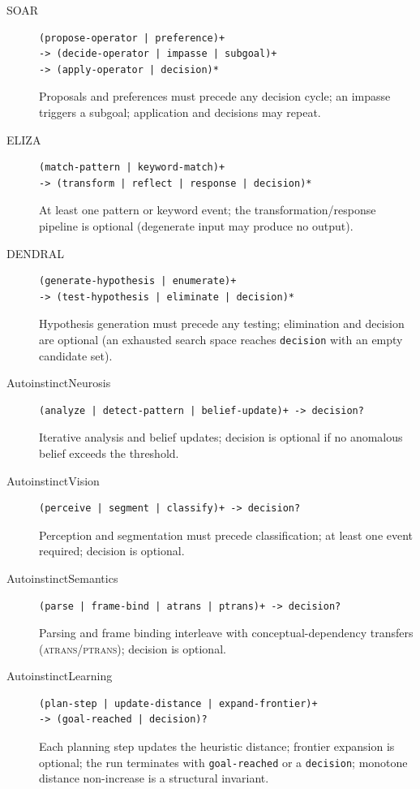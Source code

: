 \begin{description}
\item[SOAR]
\begin{verbatim}
(propose-operator | preference)+
-> (decide-operator | impasse | subgoal)+
-> (apply-operator | decision)*
\end{verbatim}
Proposals and preferences must precede any decision cycle; an impasse
triggers a subgoal; application and decisions may repeat.

\item[ELIZA]
\begin{verbatim}
(match-pattern | keyword-match)+
-> (transform | reflect | response | decision)*
\end{verbatim}
At least one pattern or keyword event; the transformation/response
pipeline is optional (degenerate input may produce no output).

\item[DENDRAL]
\begin{verbatim}
(generate-hypothesis | enumerate)+
-> (test-hypothesis | eliminate | decision)*
\end{verbatim}
Hypothesis generation must precede any testing; elimination and decision
are optional (an exhausted search space reaches \texttt{decision} with
an empty candidate set).

\item[AutoinstinctNeurosis]
\begin{verbatim}
(analyze | detect-pattern | belief-update)+ -> decision?
\end{verbatim}
Iterative analysis and belief updates; decision is optional if no
anomalous belief exceeds the threshold.

\item[AutoinstinctVision]
\begin{verbatim}
(perceive | segment | classify)+ -> decision?
\end{verbatim}
Perception and segmentation must precede classification; at least one
event required; decision is optional.

\item[AutoinstinctSemantics]
\begin{verbatim}
(parse | frame-bind | atrans | ptrans)+ -> decision?
\end{verbatim}
Parsing and frame binding interleave with conceptual-dependency transfers
(\textsc{atrans}/\textsc{ptrans}); decision is optional.

\item[AutoinstinctLearning]
\begin{verbatim}
(plan-step | update-distance | expand-frontier)+
-> (goal-reached | decision)?
\end{verbatim}
Each planning step updates the heuristic distance; frontier expansion
is optional; the run terminates with \texttt{goal-reached} or a
\texttt{decision}; monotone distance non-increase is a structural invariant.

\end{description}

